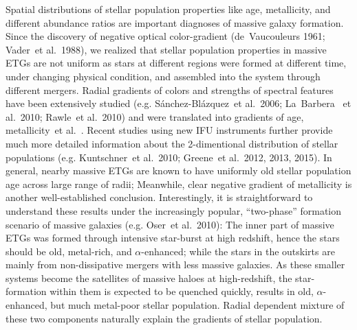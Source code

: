 \documentclass[preprint]{aastex}
\def\etal{{\ et al.~}}
\begin{document}
\begin{CJK*}{UTF8}{gbsn}
  Spatial distributions of stellar population properties like age, 
  metallicity, and different abundance ratios are important diagnoses 
  of massive galaxy formation.  Since the discovery of negative 
  optical color-gradient (de~Vaucouleurs 1961; Vader\etal 1988), we 
  realized that stellar population properties in massive ETGs are not 
  uniform as stars at different regions were formed at different time, 
  under changing physical condition, and assembled into the system  
  through different mergers.  Radial gradients of colors and strengths 
  of spectral features have been extensively studied 
  (e.g. S{\'a}nchez-Bl{\'a}zquez\etal 2006; La~Barbera \etal 2010; 
  Rawle\etal 2010) and were translated into gradients of age, 
  metallicity\etal.  Recent studies using new IFU instruments further 
  provide much more detailed information about the 2-dimentional 
  distribution of stellar populations (e.g. Kuntschner\etal 2010; 
  Greene\etal 2012, 2013, 2015).  In general, nearby massive ETGs 
  are known to have uniformly old stellar population age across large
  range of radii; Meanwhile, clear negative gradient of metallicity
  is another well-established conclusion.  Interestingly, it is 
  straightforward to understand these results under the increasingly 
  popular, ``two-phase'' formation scenario of massive galaxies
  (e.g. Oser\etal 2010): The inner part of massive ETGs was formed 
  through intensive star-burst at high redshift, hence the stars should
  be old, metal-rich, and $\alpha$-enhanced; while the stars in the 
  outskirts are mainly from non-dissipative mergers with less massive 
  galaxies.  As these smaller systems become the satellites of massive 
  haloes at high-redshift, the star-formation within them is expected to 
  be quenched quickly, results in old, $\alpha$-enhanced, but much 
  metal-poor stellar population.  Radial dependent mixture of these 
  two components naturally explain the gradients of stellar population. 
  

\end{CJK*}
\end{document}
